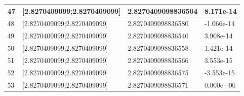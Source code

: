 \documentclass[a4paper, 11pt]{article}
\begin{document}
\begin{table}[H]
\begin{tabular}{llll}
\multicolumn{1}{|l|}{47} & \multicolumn{1}{l|}{{[}2.8270409099;2.8270409099{]}} & \multicolumn{1}{l|}{2.8270409098836504} & \multicolumn{1}{l|}{8.171e-14} \\ \hline
\multicolumn{1}{|l|}{48} & \multicolumn{1}{l|}{{[}2.8270409099;2.8270409099{]}} & \multicolumn{1}{l|}{2.8270409098836580} & \multicolumn{1}{l|}{-1.066e-14} \\ \hline
\multicolumn{1}{|l|}{49} & \multicolumn{1}{l|}{{[}2.8270409099;2.8270409099{]}} & \multicolumn{1}{l|}{2.8270409098836540} & \multicolumn{1}{l|}{3.908e-14} \\ \hline
\multicolumn{1}{|l|}{50} & \multicolumn{1}{l|}{{[}2.8270409099;2.8270409099{]}} & \multicolumn{1}{l|}{2.8270409098836558} & \multicolumn{1}{l|}{1.421e-14} \\ \hline
\multicolumn{1}{|l|}{51} & \multicolumn{1}{l|}{{[}2.8270409099;2.8270409099{]}} & \multicolumn{1}{l|}{2.8270409098836566} & \multicolumn{1}{l|}{3.553e-15} \\ \hline
\multicolumn{1}{|l|}{52} & \multicolumn{1}{l|}{{[}2.8270409099;2.8270409099{]}} & \multicolumn{1}{l|}{2.8270409098836575} & \multicolumn{1}{l|}{-3.553e-15} \\ \hline
\multicolumn{1}{|l|}{53} & \multicolumn{1}{l|}{{[}2.8270409099;2.8270409099{]}} & \multicolumn{1}{l|}{2.8270409098836571} & \multicolumn{1}{l|}{0.000e+00} \\ \hline
\end{tabular}
\end{table}
\end{document}
